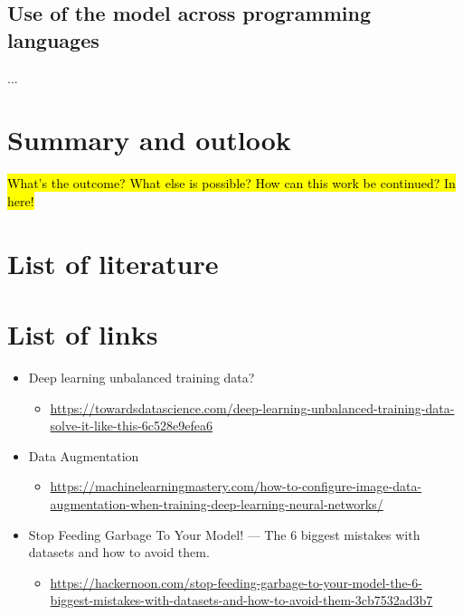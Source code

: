 \documentclass[10pt]{article}
\begin{document}
		\subsection{Use of the model across programming languages}
			\noindent ...



	\pagebreak
	\section{Summary and outlook}
		\hl{What's the outcome? What else is possible? How can this work be continued? In here!}


	\pagebreak
	\renewcommand{\listfigurename}{List of figures}
	\listoffigures
	\listoftables
	


	\pagebreak	
	\section*{List of literature}
		\printbibliography[heading=none]
	


	\pagebreak	
	\section*{List of links}
		\begin{itemize}
			\item Deep learning unbalanced training data?
			\begin{itemize}
				\item \url{https://towardsdatascience.com/deep-learning-unbalanced-training-data-solve-it-like-this-6c528e9efea6}
			\end{itemize}
			\item Data Augmentation
			\begin{itemize}
				\item \url{https://machinelearningmastery.com/how-to-configure-image-data-augmentation-when-training-deep-learning-neural-networks/}
			\end{itemize}
			\item Stop Feeding Garbage To Your Model! — The 6 biggest mistakes with datasets and how to avoid them.
			\begin{itemize}
				\item \url{https://hackernoon.com/stop-feeding-garbage-to-your-model-the-6-biggest-mistakes-with-datasets-and-how-to-avoid-them-3cb7532ad3b7}
			\end{itemize}
		\end{itemize}
	
\end{document}
